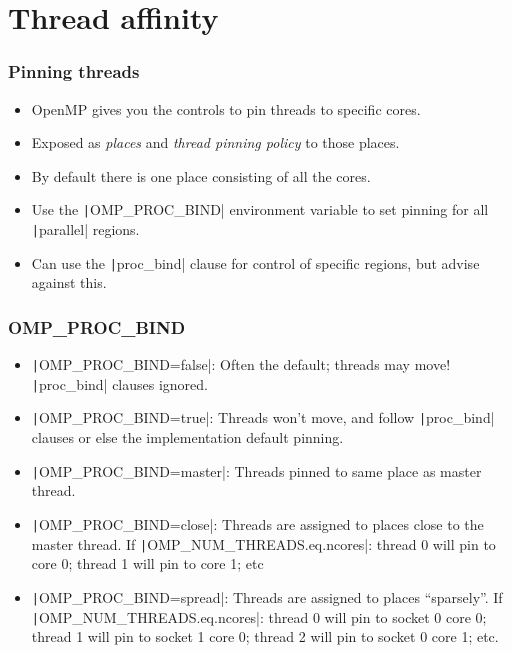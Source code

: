 \documentclass[aspectratio=169]{beamer}
\begin{document}
\section{Thread affinity}
\begin{frame}
\frametitle{Pinning threads}
\begin{itemize}
  \item OpenMP gives you the controls to pin threads to specific cores.
  \item Exposed as \emph{places} and \emph{thread pinning policy} to those places.
  \item By default there is one place consisting of all the cores.
  \item Use the \texttt|OMP_PROC_BIND| environment variable to set pinning for all \texttt|parallel| regions.
  \item Can use the \texttt|proc_bind| clause for control of specific regions, but advise against this.
\end{itemize}
\end{frame}

\begin{frame}
\frametitle{OMP\_PROC\_BIND}
\begin{itemize}
  \item \texttt|OMP_PROC_BIND=false|: Often the default; threads may move! \texttt|proc_bind| clauses ignored.
  \item \texttt|OMP_PROC_BIND=true|: Threads won't move, and follow \texttt|proc_bind| clauses or else the implementation default pinning.
  \item \texttt|OMP_PROC_BIND=master|: Threads pinned to same place as master thread.
  \item \texttt|OMP_PROC_BIND=close|: Threads are assigned to places close to the master thread.
  If \texttt|OMP_NUM_THREADS.eq.ncores|: thread 0 will pin to core 0; thread 1 will pin to core 1; etc
  \item \texttt|OMP_PROC_BIND=spread|: Threads are assigned to places ``sparsely''.
  If \texttt|OMP_NUM_THREADS.eq.ncores|: thread 0 will pin to socket 0 core 0; thread 1 will pin to socket 1 core 0; thread 2 will pin to socket 0 core 1; etc.
\end{itemize}
\end{frame}
\end{document}
